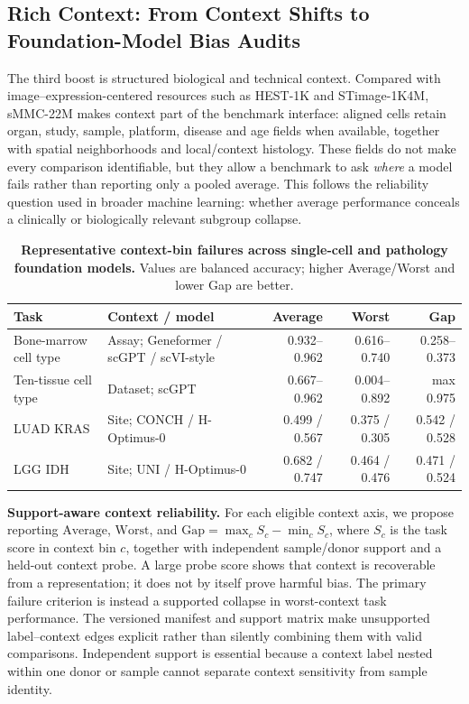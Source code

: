\documentclass[sigconf,review]{acmart}
\newcommand{\dataset}{sMMC-22M\xspace}
\begin{document}
\subsection{Rich Context: From Context Shifts to Foundation-Model Bias Audits}
The third boost is structured biological and technical context. Compared with
image--expression-centered resources such as HEST-1K and STimage-1K4M,
\dataset makes context part of the benchmark interface: aligned cells retain
organ, study, sample, platform, disease and age fields when available, together
with spatial neighborhoods and local/context histology. These fields do not
make every comparison identifiable, but they allow a benchmark to ask
\emph{where} a model fails rather than reporting only a pooled average.
This follows the reliability question used in broader machine learning:
whether average performance conceals a clinically or biologically relevant
subgroup collapse.


\begin{table}[t]
\centering
\footnotesize
\setlength{\tabcolsep}{3.0pt}
\renewcommand{\arraystretch}{1.02}
\caption{\textbf{Representative context-bin failures across single-cell and
pathology foundation models.} Values are balanced accuracy; higher
Average/Worst and lower Gap are better.}
\label{tab:context_bias_audit}
\begin{tabular*}{\textwidth}{@{\extracolsep{\fill}}llrrr@{}}
\toprule
Task & Context / model & Average & Worst & Gap \\
\midrule
Bone-marrow cell type &
Assay; Geneformer / scGPT / scVI-style &
0.932--0.962 & 0.616--0.740 & 0.258--0.373 \\
Ten-tissue cell type &
Dataset; scGPT &
0.667--0.962 & 0.004--0.892 & max 0.975 \\
LUAD KRAS &
Site; CONCH / H-Optimus-0 &
0.499 / 0.567 & 0.375 / 0.305 & 0.542 / 0.528 \\
LGG IDH &
Site; UNI / H-Optimus-0 &
0.682 / 0.747 & 0.464 / 0.476 & 0.471 / 0.524 \\
\bottomrule
\end{tabular*}
\end{table}


\noindent\textbf{Support-aware context reliability.}
For each eligible context axis, we propose reporting
\(\mathrm{Average}\), \(\mathrm{Worst}\), and
\(\mathrm{Gap}=\max_c S_c-\min_c S_c\), where \(S_c\) is the task score in
context bin \(c\), together with independent
sample/donor support and a held-out context probe. A large probe score shows
that context is recoverable from a representation; it does not by itself prove
harmful bias. The primary failure criterion is instead a supported collapse in
worst-context task performance. The versioned manifest and support matrix make
unsupported label--context edges explicit rather than silently combining them
with valid comparisons.
Independent support is essential because a context label nested within one
donor or sample cannot separate context sensitivity from sample identity.
\end{document}
